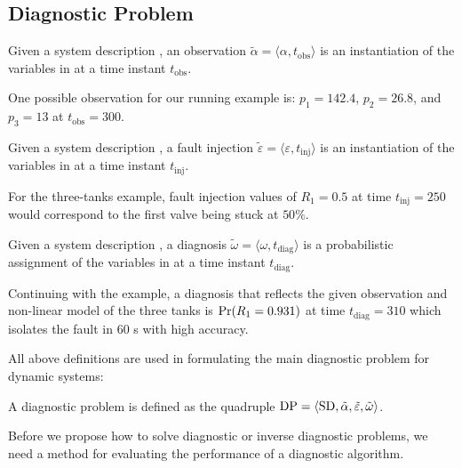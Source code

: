 \subsection{Diagnostic Problem}
%
\begin{definition}[Observation]
%
Given a system description \sd, an observation $\tilde\alpha =
\langle\alpha, t_{\mathrm{obs}}\rangle$ is an instantiation of the
variables in \obs at a time instant $t_{\mathrm{obs}}$.
%
\end{definition}
%
One possible observation for our running example is:
$p_1 = 142.4$, $p_2 = 26.8$, and $p_3 = 13$ at $t_{\mathrm{obs}} =
300$.
%
\begin{definition}
%
Given a system description \sd, a fault injection $\tilde{\varepsilon}
= \langle\varepsilon, t_{\mathrm{inj}}\rangle$ is an instantiation of
the variables in \comps at a time instant $t_{\mathrm{inj}}$.
%
\end{definition}
%
For the three-tanks example, fault injection values of $R_1 = 0.5$ at
time $t_{\mathrm{inj}} = 250$ would correspond to the first valve
being stuck at $50\%$.
%
\begin{definition}[Diagnosis]\label{def:diagnosis}
%
Given a system description \sd, a diagnosis $\tilde{\omega} =
\langle\omega, t_{\mathrm{diag}}\rangle$ is a probabilistic assignment
of the variables in \comps at a time instant $t_{\mathrm{diag}}$.
%
\end{definition}
%
Continuing with the example, a diagnosis that reflects the given
observation and non-linear model of the three tanks is $\mathrm{Pr}(R_1 =
0.931)$ at time $t_{\mathrm{diag}} = 310$ which isolates the fault in
$60$ s with high accuracy.
\par
All above definitions are used in formulating the main diagnostic
problem for dynamic systems:
%
\begin{definition}
%
A diagnostic problem \dproblem is defined as the quadruple $\mathrm{DP}
= \langle\mathrm{SD}, \tilde{\alpha}, \tilde{\varepsilon},
\tilde{\omega}\rangle$.
%
\end{definition}
%
Before we propose how to solve diagnostic or inverse diagnostic
problems, we need a method for evaluating the performance of a
diagnostic algorithm.
%
